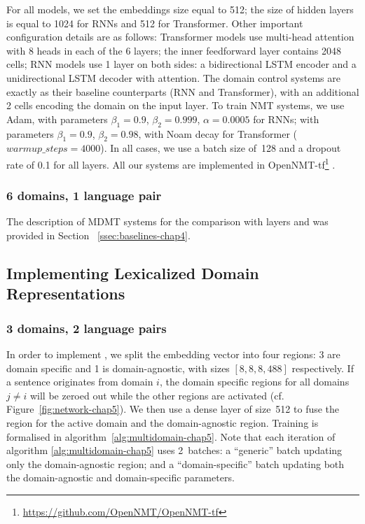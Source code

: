 For all models, we set the embeddings size equal to 512; the size of hidden layers is equal to 1024 for RNNs and 512 for Transformer. 
Other important configuration details are as follows:
Transformer models use multi-head attention with 8 heads in each of the 6 layers; 
the inner feedforward layer contains 2048 cells;  
RNN models use 1 layer on both sides: 
a bidirectional LSTM encoder and a unidirectional LSTM decoder with attention.
The domain control systems are exactly as their baseline counterparts (RNN and Transformer), with an additional 2 cells encoding the domain on the input layer.
To train NMT systems, we use Adam, with parameters $\beta_1=0.9$, $\beta_2 = 0.999$, $\alpha=0.0005$ for RNNs; with parameters $\beta_1=0.9$, $\beta_2= 0.98$, with Noam decay \citep{Vaswani17attention} for Transformer ($warmup\_steps=4000$). In all cases, we use a batch size of~128 and a dropout rate of 0.1 for all layers. 
All our systems are implemented in OpenNMT-tf\footnote{\url{https://github.com/OpenNMT/OpenNMT-tf}} \citep{Klein17opennmt}.
\subsubsection{6 domains, 1 language pair}
The description of MDMT systems for the comparison with  layers and  was provided in Section ~\ref{ssec:baselines-chap4}.

\subsection{Implementing Lexicalized Domain Representations}
\subsubsection{3 domains, 2 language pairs}
\label{sssec:ldr3domain-chap5}
In order to implement , we split the embedding vector into four regions: 3 are domain specific and 1 is domain-agnostic, with sizes $[8,8,8,488]$ respectively. If a sentence originates from domain $i$, the domain specific regions for all domains $j \neq i$ will be zeroed out while the other regions are activated (cf. Figure~\ref{fig:network-chap5}). 
We then use a dense layer of size~512 to fuse the region for the active domain and the domain-agnostic region. Training is formalised in algorithm~\ref{alg:multidomain-chap5}.
%
Note that each iteration of algorithm \ref{alg:multidomain-chap5} uses 2~batches: a ``generic'' batch updating only the domain-agnostic region; and a ``domain-specific'' batch updating both the domain-agnostic and domain-specific parameters. 

